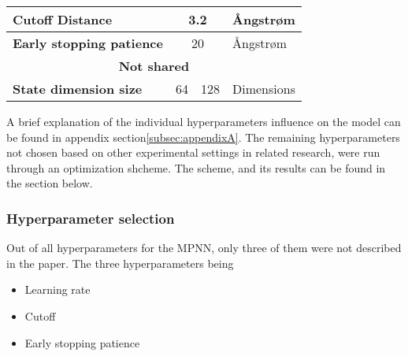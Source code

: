 \begin{table}[H]
\begin{tabular}{|lcll|}
        \multicolumn{1}{|l|}{\textbf{Cutoff Distance}}                       & \multicolumn{2}{c|}{3.2}                      & Ångstrøm                                                                \\ \hline
        \multicolumn{1}{|l|}{\textbf{Early stopping patience}}               & \multicolumn{2}{c|}{20}                       & Ångstrøm                                                                \\ \hline
        \multicolumn{4}{|c|}{\textbf{Not shared}}                                                                                                                                                      \\ \hline
        \multicolumn{1}{|l|}{\textbf{State dimension size}}                  & \multicolumn{1}{c|}{64}                       & \multicolumn{1}{c|}{128}                       & Dimensions             \\ \hline
    \end{tabular}
\end{table}

A brief explanation of the individual hyperparameters influence on the model can be found in appendix section\ref{subsec:appendixA}.
The remaining hyperparameters not chosen based on other experimental settings in related research, were run through an optimization shcheme.
The scheme, and its results can be found in the section below.

\subsubsection{Hyperparameter selection}\label{subsubsec:selec:hyperparam}

Out of all hyperparameters for the MPNN, only three of them were not described in the paper\cite{PAINN}. The three hyperparameters being

\begin{itemize}
    \item Learning rate
    \item Cutoff
    \item Early stopping patience
\end{itemize}

